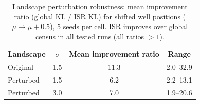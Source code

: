 \begin{table}[htbp]
  \centering
  \caption{Landscape perturbation robustness: mean improvement ratio
  (global KL / ISR KL) for shifted well positions ($\mu \to \mu + 0.5$),
  5 seeds per cell. ISR improves over global census in all tested runs
  (all ratios $>1$).}
  \label{tab:landscape_perturbation}
  \small
  \begin{tabular}{lccc}
    \toprule
    Landscape & $\sigma$ & Mean improvement ratio & Range \\
    \midrule
    Original & 1.5 & 11.3 & 2.0--32.9 \\
    Perturbed & 1.5 & 6.2 & 2.2--13.1 \\
    Perturbed & 3.0 & 7.0 & 1.9--20.6 \\
    \bottomrule
  \end{tabular}
\end{table}
